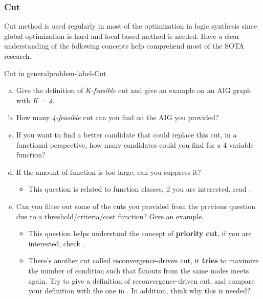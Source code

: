 \documentclass[main.tex]{subfiles}
\begin{document}
\subsubsection{Cut}
Cut method is used regularly in most of the optimization in logic synthesis since global optimization is hard and local based method is needed. Have a clear understanding of the following concepts help comprehend most of the SOTA research.
\begin{problem}{Cut in general}{problem-label-Cut}
\begin{enumerate}[(a)]
   \item Give the definition of \textit{K-feasible} cut and give an example on an AIG graph with \textit{K = 4}.
   \item How many \textit{4-feasible} cut can you find on the AIG you provided? 
   \item If you want to find a better candidate that could replace this cut, in a functional perspective, how many candidates could you find for a 4 variable function?
   \item If the amount of function is too large, can you suppress it?
   \begin{itemize}
       \item This question is related to function classes, if you are interested, read \cite{HuangNPN}.
   \end{itemize}

   \item Can you filter out some of the cuts you provided from the previous question due to a threshold/criteria/cost function? Give an example.
   \begin{itemize}
       \item This question helps understand the concept of \textbf{priority cut}, if you are interested, check \cite{PriorityCuts}.
       \item There's another cut called reconvergence-driven cut, it \textbf{tries} to maximize the number of condition such that fanouts from the same nodes meets again. Try to give a definition of reconvergence-driven cut, and compare your definition with the one in \cite{Mishchenko2006ScalableLS}. In addition, think why this is needed?
   \end{itemize}
\end{enumerate}
\end{problem}
\vspace*{4\baselineskip}
\end{document}
